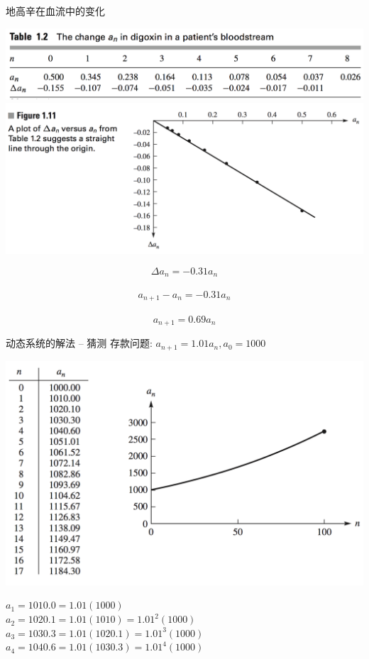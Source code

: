 \documentclass[UTF8, mathserif]{ctexbeamer}
\begin{document}
\begin{frame}{地高辛在血流中的变化}
  \begin{center}
    \includegraphics[width=.8\textwidth{}]{digoxin-table.png}\\
    \includegraphics[width=.8\textwidth{}]{digoxin-fig.png}
  \end{center}
\[
\Delta a_n = -0.31a_n
\]\\[-20pt]
\[
a_{n+1} -  a_n = -0.31a_n
\]\\[-20pt]
\[
a_{n+1} = 0.69a_n
\]
\end{frame}

\begin{frame}{动态系统的解法 -- 猜测}
  存款问题: $a_{n+1} = 1.01a_n, a_0 = 1000$
  \begin{center}
    \includegraphics[width=.4\textwidth{}]{saving.png}
  \end{center}

$a_1 = 1010.0 = 1.01(1000)$\\
$a_2 = 1020.1 = 1.01(1010) = 1.01^2 (1000)$\\
$a_3 = 1030.3 = 1.01(1020.1) = 1.01^3 (1000)$\\
$a_4 = 1040.6 = 1.01(1030.3) = 1.01^4 (1000)$
\end{frame}
\end{document}
